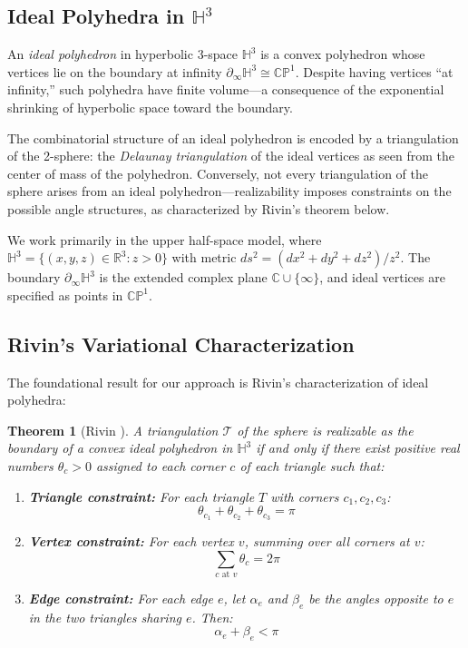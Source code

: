 \documentclass[11pt]{article}
\newtheorem{theorem}{Theorem}
\begin{document}
\subsection{Ideal Polyhedra in $\mathbb{H}^3$}

An \emph{ideal polyhedron} in hyperbolic 3-space $\mathbb{H}^3$ is a convex polyhedron whose vertices lie on the boundary at infinity $\partial_\infty \mathbb{H}^3 \cong \mathbb{CP}^1$. Despite having vertices ``at infinity,'' such polyhedra have finite volume---a consequence of the exponential shrinking of hyperbolic space toward the boundary.

The combinatorial structure of an ideal polyhedron is encoded by a triangulation of the 2-sphere: the \emph{Delaunay triangulation} of the ideal vertices as seen from the center of mass of the polyhedron. Conversely, not every triangulation of the sphere arises from an ideal polyhedron---realizability imposes constraints on the possible angle structures, as characterized by Rivin's theorem below.

We work primarily in the upper half-space model, where $\mathbb{H}^3 = \{(x,y,z) \in \mathbb{R}^3 : z > 0\}$ with metric $ds^2 = (dx^2 + dy^2 + dz^2)/z^2$. The boundary $\partial_\infty \mathbb{H}^3$ is the extended complex plane $\mathbb{C} \cup \{\infty\}$, and ideal vertices are specified as points in $\mathbb{CP}^1$.

\subsection{Rivin's Variational Characterization}

The foundational result for our approach is Rivin's characterization of ideal polyhedra:

\begin{theorem}[Rivin \cite{Rivin1994,RivinCombOpt}]
A triangulation $\mathcal{T}$ of the sphere is realizable as the boundary of a convex ideal polyhedron in $\mathbb{H}^3$ if and only if there exist positive real numbers $\theta_c > 0$ assigned to each corner $c$ of each triangle such that:
\begin{enumerate}[label=(\roman*)]
    \item \textbf{Triangle constraint:} For each triangle $T$ with corners $c_1, c_2, c_3$:
    \[
    \theta_{c_1} + \theta_{c_2} + \theta_{c_3} = \pi
    \]
    \item \textbf{Vertex constraint:} For each vertex $v$, summing over all corners at $v$:
    \[
    \sum_{c \text{ at } v} \theta_c = 2\pi
    \]
    \item \textbf{Edge constraint:} For each edge $e$, let $\alpha_e$ and $\beta_e$ be the angles opposite to $e$ in the two triangles sharing $e$. Then:
    \[
    \alpha_e + \beta_e < \pi
    \]
\end{enumerate}
\end{theorem}
\end{document}
